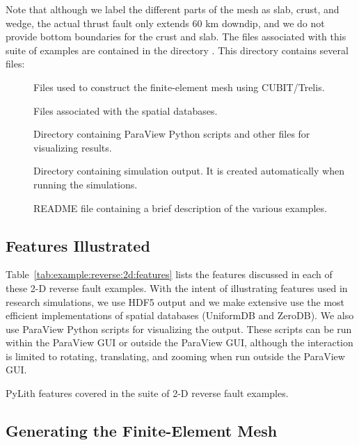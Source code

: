 Note that although we label the different parts of the mesh as slab,
crust, and wedge, the actual thrust fault only extends 60 km downdip,
and we do not provide bottom boundaries for the crust and slab.
The files associated with this suite of examples are contained in the
directory . This directory contains
several files:
\begin{description}
\item[] Files used to construct the finite-element mesh using
  CUBIT/Trelis.
\item[] Files associated with the spatial databases.
\item[] Directory containing ParaView
  Python scripts and other files for visualizing results.
\item[] Directory containing simulation
  output. It is created automatically when running the
  simulations.
\item[] README file containing a brief description
  of the various examples.
\end{description}


\subsection{Features Illustrated}

Table~\ref{tab:example:reverse:2d:features} lists the features
discussed in each of these 2-D reverse fault examples. With the
intent of illustrating features used in research simulations, we use
HDF5 output and we make extensive use the most efficient
implementations of spatial databases (UniformDB and ZeroDB). We
also use ParaView Python scripts for visualizing the output. These
scripts can be run within the ParaView GUI or outside the ParaView
GUI, although the interaction is limited to rotating, translating, and
zooming when run outside the ParaView GUI.

\begin{table}[htbp]
  \caption{PyLith features covered in the suite of 2-D reverse fault examples.}
  \label{tab:example:reverse:2d:features}
  
\end{table}

\subsection{Generating the Finite-Element Mesh}

